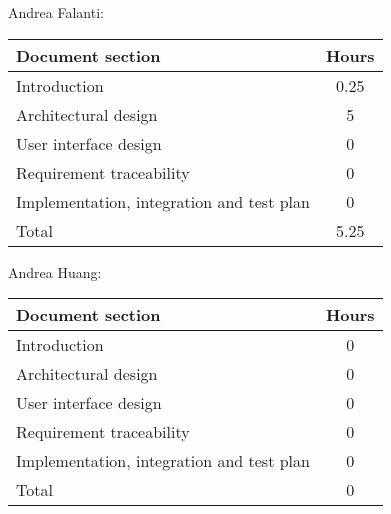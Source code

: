 Andrea Falanti:

\begin{tabular}{|l|c|}
    \hline
    Document section & Hours \\
    \hline
     Introduction & 0.25\\
     Architectural design & 5\\
     User interface design & 0\\
     Requirement traceability & 0\\
     Implementation, integration and test plan & 0\\
     \hline
     Total & 5.25\\
     \hline
\end{tabular}
\vskip 0.3in

Andrea Huang:

\begin{tabular}{|l|c|}
    \hline
    Document section & Hours \\
    \hline
     Introduction & 0\\
     Architectural design & 0\\
     User interface design & 0\\
     Requirement traceability & 0\\
     Implementation, integration and test plan & 0\\
     \hline
     Total & 0\\
     \hline
\end{tabular}